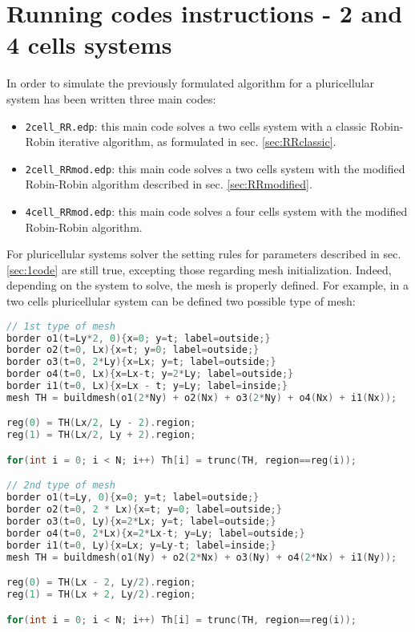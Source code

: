 \section{Running codes instructions - 2 and 4 cells systems}\label{sec:code_RR}
In order to simulate the previously formulated algorithm for a pluricellular system has  been written three main codes:
\begin{itemize}
    \item \verb|2cell_RR.edp|: this main code solves a two cells system with a classic Robin-Robin iterative algorithm, as formulated in sec. \ref{sec:RRclassic}.
    \item \verb|2cell_RRmod.edp|: this main code solves a two cells system with the modified Robin-Robin algorithm described in sec. \ref{sec:RRmodified}.
    \item \verb|4cell_RRmod.edp|: this main code solves a four cells system with the modified Robin-Robin algorithm.
\end{itemize}

For pluricellular systems solver the setting rules for parameters described in sec. \eqref{sec:1code} are still true, excepting those regarding mesh initialization. Indeed, depending on the system to solve, the mesh is properly defined. For example, in a two cells pluricellular system can be defined two possible type of mesh:
\begin{lstlisting}[firstnumber = 24, language = C++, caption = 2cell\_RRmod.edp: choice of mesh]
// 1st type of mesh
border o1(t=Ly*2, 0){x=0; y=t; label=outside;}
border o2(t=0, Lx){x=t; y=0; label=outside;}
border o3(t=0, 2*Ly){x=Lx; y=t; label=outside;}
border o4(t=0, Lx){x=Lx-t; y=2*Ly; label=outside;}
border i1(t=0, Lx){x=Lx - t; y=Ly; label=inside;}
mesh TH = buildmesh(o1(2*Ny) + o2(Nx) + o3(2*Ny) + o4(Nx) + i1(Nx));

reg(0) = TH(Lx/2, Ly - 2).region;
reg(1) = TH(Lx/2, Ly + 2).region;

for(int i = 0; i < N; i++) Th[i] = trunc(TH, region==reg(i));

// 2nd type of mesh
border o1(t=Ly, 0){x=0; y=t; label=outside;}
border o2(t=0, 2 * Lx){x=t; y=0; label=outside;}
border o3(t=0, Ly){x=2*Lx; y=t; label=outside;}
border o4(t=0, 2*Lx){x=2*Lx-t; y=Ly; label=outside;}
border i1(t=0, Ly){x=Lx; y=Ly-t; label=inside;}
mesh TH = buildmesh(o1(Ny) + o2(2*Nx) + o3(Ny) + o4(2*Nx) + i1(Ny));

reg(0) = TH(Lx - 2, Ly/2).region;
reg(1) = TH(Lx + 2, Ly/2).region;

for(int i = 0; i < N; i++) Th[i] = trunc(TH, region==reg(i));
\end{lstlisting}

